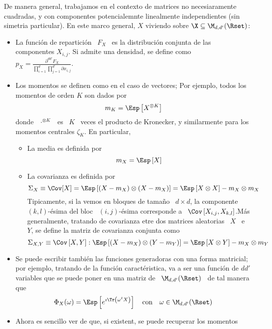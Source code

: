De  manera general,  trabajamos en  el  contexto de  matrices no  necesiaramente
cuadradas,  y  con componentes  potencialemnte  linealmente independientes  (sin
simetria particular).  En este marco  general, $X$ viviendo sobre  $\X \subseteq
\M_{d,d'}(\Rset)$:
%
\begin{itemize}
\item La funci\'on  de repartici\'on \ $F_X$ \ es  la distribuci\'on conjunta de
  las  componentes  $X_{i,j}$.   Si  admite  una  densidad,  se  define  como  \
  $\displaystyle      p_X       =      \frac{\partial^{d      d'} F_X}{\prod_{i=1}^d
    \prod_{j=1}^{d'} \partial x_{i,j}}$.
%
\item Los  momentos se definen como en  el caso de vectores;  Por ejemplo, todos
  los momentos de orden $K$ son dados por
  \[
  m_K = \Esp\left[ X^{\otimes K} \right]
  \]
  donde \  $\cdot^{\otimes K}$ \ es  \ $K$ \  veces el producto de  Kronecker, y
  similarmente para los momentos centrales $\zeta_K$. En particular,
  \begin{itemize}
  \item La media es definida por
    \[
    m_X = \Esp\left[ X \right]
    \]
  \item  La covarianza  es  definida por
    \[
    \Sigma_X  \equiv \Cov[X]  =  \Esp\left[ (X-m_X)  \otimes  (X-m_X) \right]  =
    \Esp\left[ X \otimes X \right] - m_X \otimes m_X
    \]
    Tipicamente,  si  la  vemos en  bloques  de  tama\~no  \  $d \times  d$,  la
    componente  \ $(k,l)$-\'esima  del bloc  \ $(i,j)$-\'esima  corresponde  a \
    $\Cov\left[ X_{i,j} , X_{k,l} \right]$.\newline M\'as generalmente, tratando
    de covarianza  etre dos matrices aleatorias  \ $X$ \  e \ $Y$, se  define la
    matriz de covarianza conjunta como
    \[
    \Sigma_{X,Y} \equiv  \Cov\left[ X ,  Y \right] : \Esp\left[  (X-m_X) \otimes
      (Y-m_Y) \right] = \Esp\left[ X \otimes Y \right] - m_X \otimes m_Y
    \]
  \end{itemize}
%
\item  Se puede  escribir  tambi\'en  las funciones  generadoras  con una  forma
  matricial; por  ejemplo, tratando de  la funci\'on caract\'eristica, va  a ser
  una  funci\'on de  $d d'$  variables que  se puede  poner en  una matriz  de \
  $\M_{d,d'}(\Rset)$ \ de tal manera que
  \[
  \Phi_X(\omega) =  \Esp\left[ e^{\imath  \Tr\left( \omega^t X  \right)} \right]
  \quad \mbox{con} \quad \omega \in \M_{d,d'}(\Rset)
  \]
%
\item Ahora es sencillo ver de que, si existent, se puede recuperar los momentos

\end{itemize}
